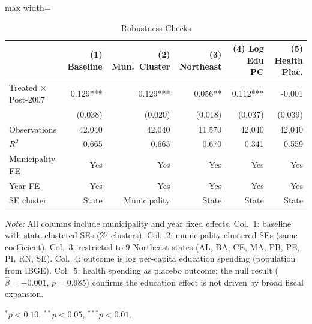 \begin{table}[!htbp]
\centering
\caption{Robustness Checks\label{tab:robustness}}
\begin{adjustbox}{max width=\textwidth}
\begin{threeparttable}
\begin{tabular}{lrrrrr}
\toprule
 & (1) Baseline & (2) Mun.\ Cluster & (3) Northeast & (4) Log Edu PC & (5) Health Plac. \\
\midrule
Treated $\times$ Post-2007 & 0.129*** & 0.129*** & 0.056** & 0.112*** & -0.001 \\
 & (0.038) & (0.020) & (0.018) & (0.037) & (0.039) \\
\midrule
Observations & 42,040 & 42,040 & 11,570 & 42,040 & 42,040 \\
$R^2$ & 0.665 & 0.665 & 0.670 & 0.341 & 0.559 \\
Municipality FE & Yes & Yes & Yes & Yes & Yes \\
Year FE & Yes & Yes & Yes & Yes & Yes \\
SE cluster & State & Municipality & State & State & State \\
\bottomrule
\end{tabular}
\begin{tablenotes}
\small
\item \textit{Note:} All columns include municipality and year fixed effects. Col.\ 1: baseline with state-clustered SEs (27 clusters). Col.\ 2: municipality-clustered SEs (same coefficient). Col.\ 3: restricted to 9 Northeast states (AL, BA, CE, MA, PB, PE, PI, RN, SE). Col.\ 4: outcome is log per-capita education spending (population from IBGE). Col.\ 5: health spending as placebo outcome; the null result ($\hat{\beta} = -0.001$, $p = 0.985$) confirms the education effect is not driven by broad fiscal expansion.
\item $^{*}p<0.10$, $^{**}p<0.05$, $^{***}p<0.01$.
\end{tablenotes}
\end{threeparttable}
\end{adjustbox}
\end{table}
